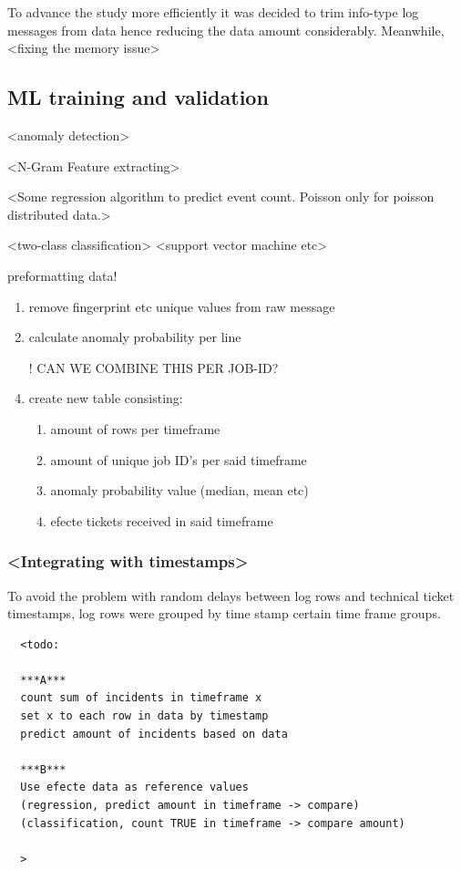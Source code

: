 To advance the study more efficiently
it was decided to trim info-type log messages from data
hence reducing the data amount considerably.
Meanwhile,
<fixing the memory issue>

\subsection{ML training and validation}\label{subsec:ml-training-and-validation}

<anomaly detection>

<N-Gram Feature extracting>

<Some regression algorithm to predict event count.
Poisson only for poisson distributed data.>

<two-class classification>
<support vector machine etc>

preformatting data! \\
\begin{enumerate}
    \item remove fingerprint etc unique values from raw message
    \item calculate anomaly probability per line
    \item [!] CAN WE COMBINE THIS PER JOB-ID?
    \item create new table consisting:
    \begin{enumerate}
        \item amount of rows per timeframe
        \item amount of unique job ID's per said timeframe
        \item anomaly probability value (median, mean etc)
        \item efecte tickets received in said timeframe
    \end{enumerate}
\end{enumerate}

\subsubsection*{<Integrating with timestamps>}
To avoid the problem with random delays
between log rows and technical ticket timestamps,
log rows were grouped by time stamp
certain time frame groups.

\begin{verbatim}
  <todo:

  ***A***
  count sum of incidents in timeframe x
  set x to each row in data by timestamp
  predict amount of incidents based on data

  ***B***
  Use efecte data as reference values
  (regression, predict amount in timeframe -> compare)
  (classification, count TRUE in timeframe -> compare amount)

  >
\end{verbatim}


